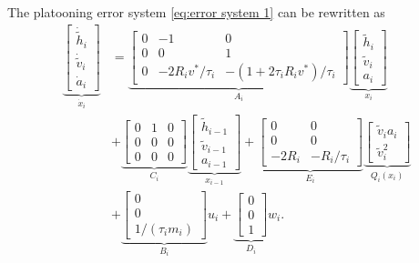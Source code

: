 \documentclass[letterpaper, 10 pt, conference]{ieeeconf}
\begin{document}
	The platooning error system \eqref{eq:error system 1} can be rewritten as
	\begin{align}\label{eq:error system 2}
		\underbrace{\begin{bmatrix}
				\dot{\tilde{h}}_i \\ \dot{\tilde{v}}_i \\ \dot{a}_i
		\end{bmatrix}}_{\dot{x}_i}
		&=
		\underbrace{\begin{bmatrix}
				0 & -1 & 0 \\ 0 & 0 & 1 \\ 0 & -2R_i v^*/\tau_i & - (1 + 2\tau_i R_i v^*)/\tau_i
		\end{bmatrix}}_{A_i}	
		\underbrace{\begin{bmatrix}
				\tilde{h}_i \\ \tilde{v}_i 	\\ a_i
		\end{bmatrix}}_{x_i} \nonumber\\
		& +
		\underbrace{\begin{bmatrix}
				0 & 1 & 0 \\0 & 0 & 0 \\0 & 0 & 0
		\end{bmatrix}}_{C_i}
		\underbrace{\begin{bmatrix}
				\tilde{h}_{i-1} \\ \tilde{v}_{i-1} \\ a_{i-1}
		\end{bmatrix}}_{x_{i-1}} +
		\underbrace{\begin{bmatrix}
				0 & 0 \\ 0 & 0 \\ - 2 R_i & - R_i/\tau_i
		\end{bmatrix}}_{E_i} 
		\underbrace{\begin{bmatrix}
				\tilde{v}_i a_i \\	\tilde{v}_i^2
		\end{bmatrix}}_{Q_i(x_i)}
		\nonumber\\
		&+
		\underbrace{\begin{bmatrix}
				0 \\ 0 \\ 1/(\tau_i m_i)
		\end{bmatrix}}_{B_i} u_i
		+
		\underbrace{\begin{bmatrix}
				0 \\ 0 \\ 1
		\end{bmatrix}}_{D_i} w_i.
	\end{align} 
	
\end{document}
